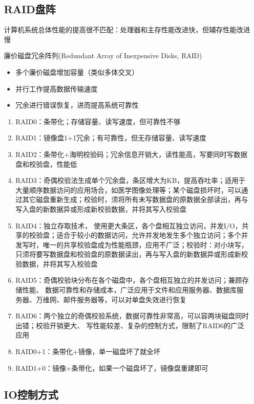 \subsection{RAID盘阵}
计算机系统总体性能的提高很不匹配：处理器和主存性能改进快，但辅存性能改进慢
\par 廉价磁盘冗余阵列(Redundant Array of Inexpensive Disks, RAID)
\begin{itemize}
	\item 多个廉价磁盘增加容量（类似多体交叉）
	\item 并行工作提高数据传输速度
	\item 冗余进行错误恢复，进而提高系统可靠性
\end{itemize}
\begin{enumerate}
	\item RAID0：条带化；存储容量、读写速度，但可靠性不够
	\item RAID1：镜像盘1+1冗余；有可靠性，但无存储容量、读写速度
	\item RAID2：条带化+海明校验码；冗余信息开销大，读性能高，写要同时写数据盘和校验盘，性能低
	\item RAID3：奇偶校验法生成单个冗余盘，条区增大为KB，提高吞吐率；适用于大量顺序数据访问的应用场合，如医学图像处理等；某个磁盘损坏时，可以通过其它磁盘重新生成；校验时，须将所有未写数据盘的原数据全部读出，再与写入盘的新数据异或形成新校验数据，并将其写入校验盘
	\item RAID4：独立存取技术， 使用更大条区，各个盘相互独立访问，并发I/O，共享的校验盘；适合于较小的数据访问，允许并发地发生多个独立访问；多个并发写时，唯一的共享校验盘成为性能瓶颈，应用不广泛；校验时：对小块写，只须将要写数据盘和校验盘的原数据读出，再与写入盘的新数据异或形成新校验数据，并将其写入校验盘
	\item RAID5：奇偶校验块分布在各个磁盘中，各个盘相互独立的并发访问；兼顾存储性能、 数据可靠性和存储成本，广泛应用于文件和应用服务器、数据库服务器、万维网、邮件服务器等，可以对单盘失效进行恢复
	\item RAID6：两个独立的奇偶校验系统，数据可靠性非常高，可以容两块磁盘同时出错；校验开销更大、 写性能较差、复杂的控制方式，限制了RAID6的广泛应用
	\item RAID0+1：条带化+镜像，单一磁盘坏了就全坏
	\item RAID1+0：镜像+条带化，如果一个磁盘坏了，镜像盘重建即可
\end{enumerate}

\subsection{IO控制方式}

